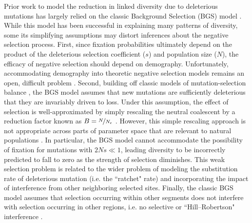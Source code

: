 \documentclass[11pt]{article}
\begin{document}
Prior work to model the reduction in linked diversity due to deleterious
mutations has largely relied on the classic Background Selection (BGS) model
\parencite{Charlesworth1993-gb,Nordborg1996-nq,Hudson1995-pt,Hudson1995-xc}.
While this model has been successful in explaining many patterns of diversity,
some its simplifying assumptions may distort inferences about the negative
selection process. First, since fixation probabilities ultimately depend on the
product of the deleterious selection coefficient ($s$) and population size
($N$), the efficacy of negative selection should depend on demography.
Unfortunately, accommodating demography into theoretic negative selection
models remains an open, difficult problem \parencite{Zeng2013-ep,Johri2020-oj}.
Second, building off classic models of mutation-selection balance
\parencite{Crow1970-wm,Kimura1966-bk}, the BGS model assumes that new mutations
are sufficiently deleterious that they are invariably driven to loss. Under
this assumption, the effect of selection is well-approximated by simply
rescaling the neutral coalescent by a reduction factor known as $B =
\nicefrac{N}{N_e}$ \parencite{Charlesworth2013-kl}. However, this simple
rescaling approach is not appropriate across parts of parameter space that are
relevant to natural populations \parencite{McVean2000-bt,Good2014-yz}. In
particular, the BGS model cannot accommodate the possibility of fixation for
mutations with $2Ns \ll 1$, leading diversity to be incorrectly predicted to
fall to zero as the strength of selection diminishes. This weak selection
problem is related to the wider problem of modeling the substitution rate of
deleterious mutation (i.e. the ``ratchet" rate) and incorporating the impact of
interference from other neighboring selected sites. Finally, the classic BGS
model assumes that selection occurring within other segments does not interfere
with selection occurring in other regions, i.e. no selective or
``Hill--Robertson" interference
\parencite{Hill1966-kd,McVean2000-bt,Felsenstein1974-xm}.
\end{document}
